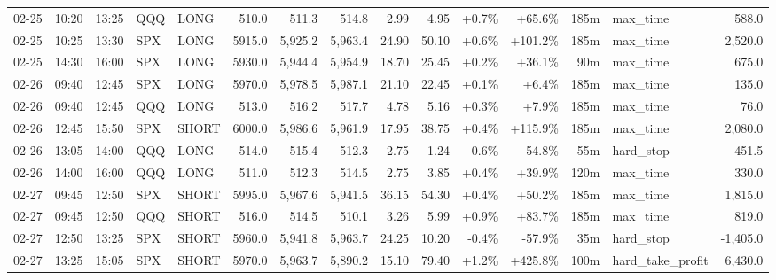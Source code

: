 \documentclass[11pt,a4paper,twoside]{article}
\begin{document}
\begin{landscape}
\begin{center}
\begin{longtable}{>{\color{txtmain}}l l l l l r r r r r r r r >{\color{txtmain}}l r}
02-25 & 10:20 & 13:25 & QQQ & LONG & 510.0 & 511.3 & 514.8 & 2.99 & 4.95 & \textcolor{wingreen}{+0.7\%} & \textcolor{wingreen}{+65.6\%} & 185m & max\_time & \textcolor{wingreen}{588.0} \\
02-25 & 10:25 & 13:30 & SPX & LONG & 5915.0 & 5,925.2 & 5,963.4 & 24.90 & 50.10 & \textcolor{wingreen}{+0.6\%} & \textcolor{wingreen}{+101.2\%} & 185m & max\_time & \textcolor{wingreen}{2,520.0} \\
02-25 & 14:30 & 16:00 & SPX & LONG & 5930.0 & 5,944.4 & 5,954.9 & 18.70 & 25.45 & \textcolor{wingreen}{+0.2\%} & \textcolor{wingreen}{+36.1\%} & 90m & max\_time & \textcolor{wingreen}{675.0} \\
02-26 & 09:40 & 12:45 & SPX & LONG & 5970.0 & 5,978.5 & 5,987.1 & 21.10 & 22.45 & \textcolor{wingreen}{+0.1\%} & \textcolor{wingreen}{+6.4\%} & 185m & max\_time & \textcolor{wingreen}{135.0} \\
02-26 & 09:40 & 12:45 & QQQ & LONG & 513.0 & 516.2 & 517.7 & 4.78 & 5.16 & \textcolor{wingreen}{+0.3\%} & \textcolor{wingreen}{+7.9\%} & 185m & max\_time & \textcolor{wingreen}{76.0} \\
02-26 & 12:45 & 15:50 & SPX & SHORT & 6000.0 & 5,986.6 & 5,961.9 & 17.95 & 38.75 & \textcolor{wingreen}{+0.4\%} & \textcolor{wingreen}{+115.9\%} & 185m & max\_time & \textcolor{wingreen}{2,080.0} \\
02-26 & 13:05 & 14:00 & QQQ & LONG & 514.0 & 515.4 & 512.3 & 2.75 & 1.24 & \textcolor{lossred}{-0.6\%} & \textcolor{lossred}{-54.8\%} & 55m & hard\_stop & \textcolor{lossred}{-451.5} \\
02-26 & 14:00 & 16:00 & QQQ & LONG & 511.0 & 512.3 & 514.5 & 2.75 & 3.85 & \textcolor{wingreen}{+0.4\%} & \textcolor{wingreen}{+39.9\%} & 120m & max\_time & \textcolor{wingreen}{330.0} \\
02-27 & 09:45 & 12:50 & SPX & SHORT & 5995.0 & 5,967.6 & 5,941.5 & 36.15 & 54.30 & \textcolor{wingreen}{+0.4\%} & \textcolor{wingreen}{+50.2\%} & 185m & max\_time & \textcolor{wingreen}{1,815.0} \\
02-27 & 09:45 & 12:50 & QQQ & SHORT & 516.0 & 514.5 & 510.1 & 3.26 & 5.99 & \textcolor{wingreen}{+0.9\%} & \textcolor{wingreen}{+83.7\%} & 185m & max\_time & \textcolor{wingreen}{819.0} \\
02-27 & 12:50 & 13:25 & SPX & SHORT & 5960.0 & 5,941.8 & 5,963.7 & 24.25 & 10.20 & \textcolor{lossred}{-0.4\%} & \textcolor{lossred}{-57.9\%} & 35m & hard\_stop & \textcolor{lossred}{-1,405.0} \\
02-27 & 13:25 & 15:05 & SPX & SHORT & 5970.0 & 5,963.7 & 5,890.2 & 15.10 & 79.40 & \textcolor{wingreen}{+1.2\%} & \textcolor{wingreen}{+425.8\%} & 100m & hard\_take\_profit & \textcolor{wingreen}{6,430.0} \\

\end{longtable}
\end{center}
\end{landscape}
\end{document}
